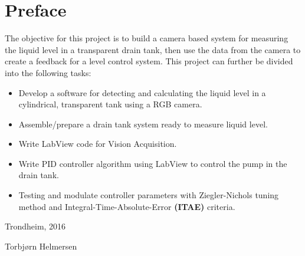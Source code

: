 \section*{Preface}

The objective for this project is to build a camera based system for measuring the liquid level in a transparent drain tank, then use the data from the camera to create a feedback for a level control system. This project can further be divided into the following tasks:

\begin{itemize}
    \item Develop a software for detecting and calculating the liquid level in a cylindrical, transparent tank using a RGB camera.
    \item Assemble/prepare a drain tank system ready to measure liquid level.
    \item Write LabView code for Vision Acquisition.
    \item Write PID controller algorithm using LabView to control the pump in the drain tank.
    \item Testing and modulate controller parameters with Ziegler-Nichols tuning method and Integral-Time-Absolute-Error \textbf{(ITAE)} criteria.
    
\end{itemize}

\centerline{Trondheim, 2016} 
\centerline{Torbjørn Helmersen}